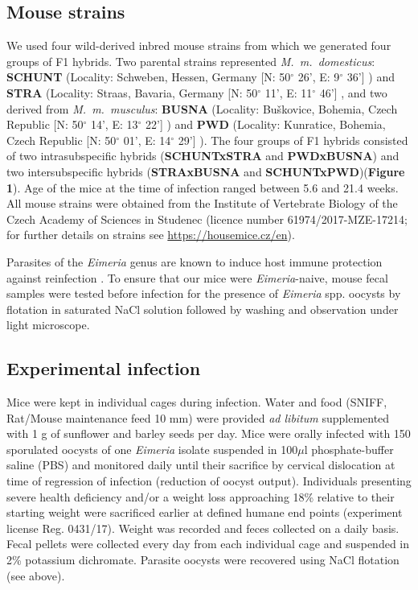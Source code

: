 \documentclass[12pt]{article}
\begin{document}
\subsection{Mouse strains}

We used four wild-derived inbred mouse strains from which we generated four groups of F1 hybrids. Two parental strains represented \textit{M.~m.~domesticus}: \textbf{SCHUNT} (Locality: Schweben, Hessen, Germany [N: 50$ ^{\circ} $ 26’, E: 9$ ^{\circ} $ 36’] \citep{martincova_phenotypic_2019}) and \textbf{STRA} (Locality: Straas, Bavaria, Germany [N: 50$ ^{\circ} $ 11’, E: 11$ ^{\circ} $ 46’] \citep{pialek_development_2008}, and two derived from \textit{M.~m.~musculus}: \textbf{BUSNA} (Locality: Buškovice, Bohemia, Czech Republic [N: 50$ ^{\circ} $ 14’, E: 13$ ^{\circ} $ 22’] \citep{pialek_development_2008}) and \textbf{PWD} (Locality: Kunratice, Bohemia, Czech Republic [N: 50$ ^{\circ} $ 01’, E: 14$ ^{\circ} $ 29’] \citep{gregorova_pwdph_2000}). The four groups of F1 hybrids consisted of two intrasubspecific hybrids (\textbf{SCHUNTxSTRA }and \textbf{PWDxBUSNA}) and two intersubspecific hybrids (\textbf{STRAxBUSNA} and \textbf{SCHUNTxPWD})(\textbf{Figure 1}). Age of the mice at the time of infection ranged between 5.6 and 21.4 weeks. All mouse strains were obtained from the Institute of Vertebrate Biology of the Czech Academy of Sciences in Studenec (licence number 61974/2017-MZE-17214; for further details on strains see \url{https://housemice.cz/en}).\par

Parasites of the \textit{Eimeria }genus are known to induce host immune protection against reinfection \citep{rose_immune_1992, smith_genetic_2000}. To ensure that our mice were \textit{Eimeria}-naive, mouse fecal samples were tested before infection for the presence of \textit{Eimeria }spp. oocysts by flotation in saturated NaCl solution followed by washing and observation under light microscope. \par

\subsection{Experimental infection}

Mice were kept in individual cages during infection. Water and food (SNIFF, Rat/Mouse maintenance feed 10 mm) were provided \textit{ad libitum} supplemented with 1 g of sunflower and barley seeds per day. Mice were orally infected with 150 sporulated oocysts of one \textit{Eimeria }isolate suspended in 100$\mu$l phosphate-buffer saline (PBS) and monitored daily until their sacrifice by cervical dislocation at time of regression of infection (reduction of oocyst output). Individuals presenting severe health deficiency and/or a weight loss approaching 18\% relative to their starting weight were sacrificed earlier at defined humane end points (experiment license Reg. 0431/17). Weight was recorded and feces collected on a daily basis. Fecal pellets were collected every day from each individual cage and suspended in 2\% potassium dichromate. Parasite oocysts were recovered using NaCl flotation (see above). \par
\end{document}
